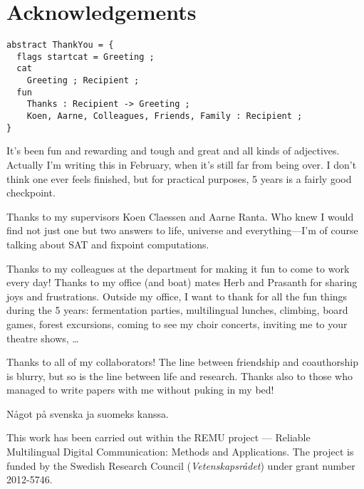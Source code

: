 \chapter*{Acknowledgements}\label{chp:acknowledgements}


\begin{verbatim}
abstract ThankYou = {
  flags startcat = Greeting ;
  cat 
    Greeting ; Recipient ;
  fun
    Thanks : Recipient -> Greeting ;
    Koen, Aarne, Colleagues, Friends, Family : Recipient ;
}
\end{verbatim}


It's been fun and rewarding and tough and great and all kinds of adjectives. Actually I'm writing this in February, when it's still far from being over.
I don't think one ever feels finished, but for practical purposes, 5 years is a fairly good checkpoint.

Thanks to my supervisors Koen Claessen and Aarne Ranta. Who knew I would find not just one but two answers to life, universe and everything---I'm of course talking about SAT and fixpoint computations.

Thanks to my colleagues at the department for making it fun to come to work every day! Thanks to my office (and boat) mates Herb and Prasanth for sharing joys and frustrations. Outside my office, I want to thank  for all the fun things during the 5 years: fermentation parties, multilingual lunches, climbing, board games, forest excursions, coming to see my choir concerts, inviting me to your theatre shows, \dots

Thanks to all of my collaborators! The line between friendship and coauthorship is blurry, but so is the line between life and research. Thanks also to those who managed to write papers with me without puking in my bed!

Något på svenska ja suomeks kanssa.

\vfill\noindent
This work has been carried out within the REMU project — Reliable Multilingual Digital Communication: Methods and Applications.
The project is funded by the Swedish Research Council (\emph{Vetenskapsrådet}) under grant number 2012-5746.
